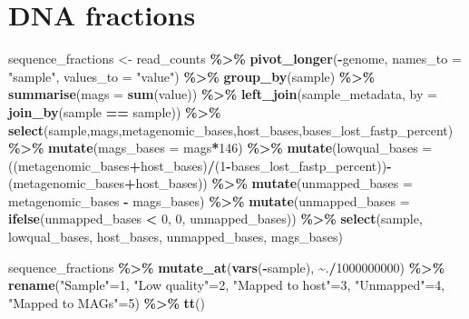 \documentclass[
]{book}
\newenvironment{Shaded}{\begin{snugshade}}{\end{snugshade}}
\newcommand{\AttributeTok}[1]{\textcolor[rgb]{0.13,0.29,0.53}{#1}}
\newcommand{\DecValTok}[1]{\textcolor[rgb]{0.00,0.00,0.81}{#1}}
\newcommand{\FunctionTok}[1]{\textcolor[rgb]{0.13,0.29,0.53}{\textbf{#1}}}
\newcommand{\NormalTok}[1]{#1}
\newcommand{\OtherTok}[1]{\textcolor[rgb]{0.56,0.35,0.01}{#1}}
\newcommand{\SpecialCharTok}[1]{\textcolor[rgb]{0.81,0.36,0.00}{\textbf{#1}}}
\newcommand{\StringTok}[1]{\textcolor[rgb]{0.31,0.60,0.02}{#1}}
\begin{document}
\section{DNA fractions}\label{dna-fractions}

\begin{Shaded}
\begin{Highlighting}[]
\NormalTok{sequence\_fractions }\OtherTok{\textless{}{-}}\NormalTok{ read\_counts }\SpecialCharTok{\%\textgreater{}\%}
  \FunctionTok{pivot\_longer}\NormalTok{(}\SpecialCharTok{{-}}\NormalTok{genome, }\AttributeTok{names\_to =} \StringTok{"sample"}\NormalTok{, }\AttributeTok{values\_to =} \StringTok{"value"}\NormalTok{) }\SpecialCharTok{\%\textgreater{}\%}
  \FunctionTok{group\_by}\NormalTok{(sample) }\SpecialCharTok{\%\textgreater{}\%}
  \FunctionTok{summarise}\NormalTok{(}\AttributeTok{mags =} \FunctionTok{sum}\NormalTok{(value)) }\SpecialCharTok{\%\textgreater{}\%}
    \FunctionTok{left\_join}\NormalTok{(sample\_metadata, }\AttributeTok{by =} \FunctionTok{join\_by}\NormalTok{(sample }\SpecialCharTok{==}\NormalTok{ sample)) }\SpecialCharTok{\%\textgreater{}\%}
    \FunctionTok{select}\NormalTok{(sample,mags,metagenomic\_bases,host\_bases,bases\_lost\_fastp\_percent) }\SpecialCharTok{\%\textgreater{}\%}
    \FunctionTok{mutate}\NormalTok{(}\AttributeTok{mags\_bases =}\NormalTok{ mags}\SpecialCharTok{*}\DecValTok{146}\NormalTok{) }\SpecialCharTok{\%\textgreater{}\%}
    \FunctionTok{mutate}\NormalTok{(}\AttributeTok{lowqual\_bases =}\NormalTok{ ((metagenomic\_bases}\SpecialCharTok{+}\NormalTok{host\_bases)}\SpecialCharTok{/}\NormalTok{(}\DecValTok{1}\SpecialCharTok{{-}}\NormalTok{bases\_lost\_fastp\_percent))}\SpecialCharTok{{-}}\NormalTok{(metagenomic\_bases}\SpecialCharTok{+}\NormalTok{host\_bases)) }\SpecialCharTok{\%\textgreater{}\%}
    \FunctionTok{mutate}\NormalTok{(}\AttributeTok{unmapped\_bases =}\NormalTok{ metagenomic\_bases }\SpecialCharTok{{-}}\NormalTok{ mags\_bases) }\SpecialCharTok{\%\textgreater{}\%}
    \FunctionTok{mutate}\NormalTok{(}\AttributeTok{unmapped\_bases =} \FunctionTok{ifelse}\NormalTok{(unmapped\_bases }\SpecialCharTok{\textless{}} \DecValTok{0}\NormalTok{, }\DecValTok{0}\NormalTok{, unmapped\_bases)) }\SpecialCharTok{\%\textgreater{}\%}
    \FunctionTok{select}\NormalTok{(sample, lowqual\_bases, host\_bases, unmapped\_bases, mags\_bases)}

\NormalTok{sequence\_fractions }\SpecialCharTok{\%\textgreater{}\%}
  \FunctionTok{mutate\_at}\NormalTok{(}\FunctionTok{vars}\NormalTok{(}\SpecialCharTok{{-}}\NormalTok{sample), }\SpecialCharTok{\textasciitilde{}}\NormalTok{.}\SpecialCharTok{/}\DecValTok{1000000000}\NormalTok{) }\SpecialCharTok{\%\textgreater{}\%}
  \FunctionTok{rename}\NormalTok{(}\StringTok{"Sample"}\OtherTok{=}\DecValTok{1}\NormalTok{, }\StringTok{"Low quality"}\OtherTok{=}\DecValTok{2}\NormalTok{, }\StringTok{"Mapped to host"}\OtherTok{=}\DecValTok{3}\NormalTok{, }\StringTok{"Unmapped"}\OtherTok{=}\DecValTok{4}\NormalTok{, }\StringTok{"Mapped to MAGs"}\OtherTok{=}\DecValTok{5}\NormalTok{) }\SpecialCharTok{\%\textgreater{}\%}
  \FunctionTok{tt}\NormalTok{()}
\end{Highlighting}
\end{Shaded}
\end{document}
